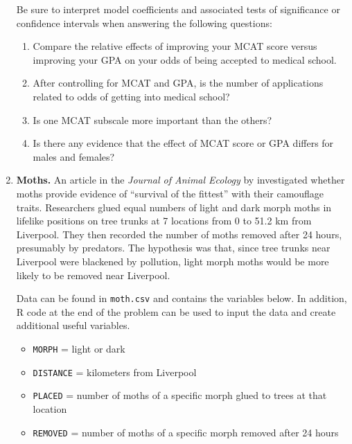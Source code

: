 \documentclass[
]{krantz}
\providecommand{\tightlist}{%
  \setlength{\itemsep}{0pt}\setlength{\parskip}{0pt}}
\begin{document}
\begin{enumerate}
  Be sure to interpret model coefficients and associated tests of significance or confidence intervals when answering the following questions:

  \begin{enumerate}
  \def\labelenumii{\alph{enumii}.}
  \tightlist
  \item
    Compare the relative effects of improving your MCAT score versus improving your GPA on your odds of being accepted to medical school.
  \item
    After controlling for MCAT and GPA, is the number of applications related to odds of getting into medical school?
  \item
    Is one MCAT subscale more important than the others?
  \item
    Is there any evidence that the effect of MCAT score or GPA differs for males and females?
  \end{enumerate}
\item
  \textbf{Moths.} An article in the \emph{Journal of Animal Ecology} by \citet{Bishop1972} investigated whether moths provide evidence of ``survival of the fittest'' with their camouflage traits. Researchers glued equal numbers of light and dark morph moths in lifelike positions on tree trunks at 7 locations from 0 to 51.2 km from Liverpool. They then recorded the number of moths removed after 24 hours, presumably by predators. The hypothesis was that, since tree trunks near Liverpool were blackened by pollution, light morph moths would be more likely to be removed near Liverpool.

  Data \citep{Ramsey2002} can be found in \texttt{moth.csv} and contains the variables below. In addition, R code at the end of the problem can be used to input the data and create additional useful variables.

  \begin{itemize}
  \tightlist
  \item
    \texttt{MORPH} = light or dark
  \item
    \texttt{DISTANCE} = kilometers from Liverpool
  \item
    \texttt{PLACED} = number of moths of a specific morph glued to trees at that location
  \item
    \texttt{REMOVED} = number of moths of a specific morph removed after 24 hours
  \end{itemize}


\end{enumerate}
\end{document}
